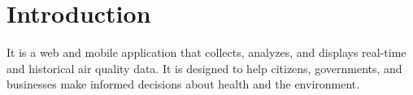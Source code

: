 \section{Introduction}

It is a web and mobile application that collects, analyzes, and displays real-time and historical air quality data. It is designed to help citizens, governments, and businesses make informed decisions about health and the environment.